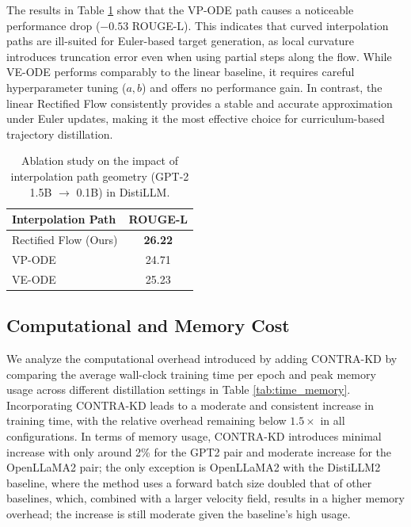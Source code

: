 \documentclass{article} %
\theoremstyle{definition}
\theoremstyle{remark}
\begin{document}
\begin{minipage}[t]{0.55\textwidth}
\vspace{0pt}
The results in Table \ref{tab:path_ablation} show that the VP-ODE path causes a noticeable performance drop ($-0.53$ ROUGE-L). This indicates that curved interpolation paths are ill-suited for Euler-based target generation, as local curvature introduces truncation error even when using partial steps along the flow. While VE-ODE performs comparably to the linear baseline, it requires careful hyperparameter tuning ($a, b$) and offers no performance gain. In contrast, the linear Rectified Flow consistently provides a stable and accurate approximation under Euler updates, making it the most effective choice for curriculum-based trajectory distillation.
\end{minipage}%
\hfill
\begin{minipage}[t]{0.4\textwidth}
\vspace{0pt} 
\vspace{-\intextsep} %
\begin{table}[H]
\centering
\caption{Ablation study on the impact of interpolation path geometry (GPT-2 1.5B $\to$ 0.1B) in DistiLLM.}
\label{tab:path_ablation}
\begin{tabular}{lc}
\toprule
\textbf{Interpolation Path} & \textbf{ROUGE-L} \\
\midrule
Rectified Flow (Ours) & \textbf{26.22} \\
VP-ODE & 24.71 \\
VE-ODE & 25.23 \\
\bottomrule
\end{tabular}
\end{table}
\end{minipage}

\subsection{Computational and Memory Cost}
\label{sec:projector_lmhead_impact}
We analyze the computational overhead introduced by adding CONTRA-KD by comparing the average wall-clock training time per epoch and peak memory usage across different distillation settings in Table \ref{tab:time_memory}. Incorporating CONTRA-KD leads to a moderate and consistent increase in training time, with the relative overhead remaining below $1.5\times$ in all configurations. In terms of memory usage, CONTRA-KD introduces minimal increase with only around 2\% for the GPT2 pair and moderate increase for the OpenLLaMA2 pair; the only exception is OpenLLaMA2 with the DistiLLM2 baseline, where the method uses a forward batch size doubled that of other baselines, which, combined with a larger velocity field, results in a higher memory overhead; the increase is still moderate given the baseline's high usage.
\end{document}
